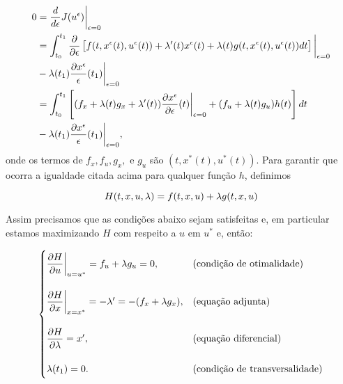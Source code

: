 \begin{equation}
    \label{eq1}
    \begin{split}
        0 &= \frac{d}{d\epsilon} J(u^{\epsilon})\bigg\rvert_{\epsilon = 0} \\ 
        &= \int_{t_0}^{t_1} \frac{\partial}{\partial \epsilon}\left[f(t, x^{\epsilon}(t), u^{\epsilon}(t)) + \lambda '(t)x^{\epsilon}(t) + \lambda(t)g(t,x^{\epsilon}(t), u^{\epsilon}(t))dt\right]\bigg\rvert_{\epsilon = 0}\\ 
        &- \lambda(t_1)\frac{\partial x^{\epsilon}}{\epsilon}(t_1)\bigg\rvert_{\epsilon = 0} \\
        &= \int_{t_0}^{t_1} \left[(f_x + \lambda(t)g_x + \lambda '(t))\frac{\partial x^{\epsilon}}{\partial\epsilon}(t)\bigg\rvert_{\epsilon = 0} + (f_u + \lambda(t)g_u)h(t)\right]dt \\
        &- \lambda(t_1)\frac{\partial x^{\epsilon}}{\epsilon}(t_1)\bigg\rvert_{\epsilon = 0},
    \end{split}
\end{equation}
onde os termos de $f_x, f_u, g_x, \text{ e } g_u$ são $(t, x^*(t), u^*(t))$. 
Para garantir que ocorra a igualdade citada acima para qualquer função $h$,
definimos  

\begin{definition}[Hamiltoniano]
    \label{hamiltonian}
    \begin{equation*}
        H(t,x,u,\lambda) = f(t,x,u) + \lambda g(t, x,u)
    \end{equation*}
\end{definition}

Assim precisamos que as condições abaixo sejam satisfeitas e, em particular estamos maximizando $H$ com respeito a $u$ em $u^*$ e, então: 

\begin{equation}
    \begin{cases}
        \dfrac{\partial H}{\partial u} \bigg\rvert_{u = u^{*}} = f_u + \lambda g_u = 0, &\text{(condição de otimalidade)}\\ \\
        \dfrac{\partial H}{\partial x} \bigg\rvert_{x = x^*} = - \lambda ' = -(f_x + \lambda g_x), &\text{(equação adjunta)} \\ \\
        \dfrac{\partial H}{\partial \lambda} = x', 
        &\text{(equação diferencial)}  \\ \\
        \lambda(t_1) = 0. &\text{(condição de transversalidade)}
    \end{cases}    
\end{equation}

